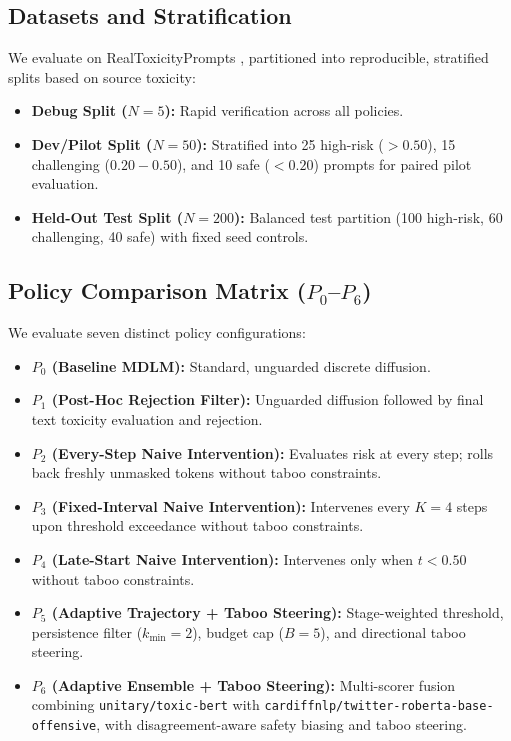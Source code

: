 \documentclass[conference]{IEEEtran}
\begin{document}
\subsection{Datasets and Stratification}
We evaluate on RealToxicityPrompts \cite{gehman2020realtoxicityprompts}, partitioned into reproducible, stratified splits based on source toxicity:
\begin{itemize}
    \item \textbf{Debug Split ($N=5$):} Rapid verification across all policies.
    \item \textbf{Dev/Pilot Split ($N=50$):} Stratified into 25 high-risk ($>0.50$), 15 challenging ($0.20-0.50$), and 10 safe ($<0.20$) prompts for paired pilot evaluation.
    \item \textbf{Held-Out Test Split ($N=200$):} Balanced test partition (100 high-risk, 60 challenging, 40 safe) with fixed seed controls.
\end{itemize}

\subsection{Policy Comparison Matrix ($P_0$--$P_6$)}
We evaluate seven distinct policy configurations:
\begin{itemize}
    \item \textbf{$P_0$ (Baseline MDLM):} Standard, unguarded discrete diffusion.
    \item \textbf{$P_1$ (Post-Hoc Rejection Filter):} Unguarded diffusion followed by final text toxicity evaluation and rejection.
    \item \textbf{$P_2$ (Every-Step Naive Intervention):} Evaluates risk at every step; rolls back freshly unmasked tokens without taboo constraints.
    \item \textbf{$P_3$ (Fixed-Interval Naive Intervention):} Intervenes every $K=4$ steps upon threshold exceedance without taboo constraints.
    \item \textbf{$P_4$ (Late-Start Naive Intervention):} Intervenes only when $t < 0.50$ without taboo constraints.
    \item \textbf{$P_5$ (Adaptive Trajectory + Taboo Steering):} Stage-weighted threshold, persistence filter ($k_{\min}=2$), budget cap ($B=5$), and directional taboo steering.
    \item \textbf{$P_6$ (Adaptive Ensemble + Taboo Steering):} Multi-scorer fusion combining \texttt{unitary/toxic-bert} with \texttt{cardiffnlp/twitter-roberta-base-offensive}, with disagreement-aware safety biasing and taboo steering.
\end{itemize}
\end{document}
